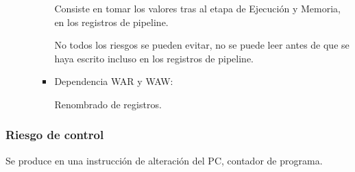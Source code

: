 \documentclass[12pt, twoside, openright]{report} %
\begin{document}
\begin{itemize}
\begin{itemize}
\begin{itemize}
			                  Consiste en tomar los valores tras al etapa de Ejecución y Memoria, en los registros de pipeline.

			                  No todos los riesgos se pueden evitar, no se puede leer antes de que se haya escrito incluso en los
			                  registros de pipeline.

			            \item Dependencia WAR y WAW:

			                  Renombrado de registros.
		            \end{itemize}

	      \end{itemize}

\end{itemize}

\subsubsection{Riesgo de control} Se produce en una instrucción de alteración del PC, contador de programa.
\end{document}
